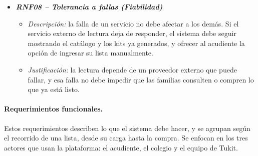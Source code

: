 \begin{itemize}
\item \textbf{\textit{RNF08 -- Tolerancia a fallas (Fiabilidad)}}
  \begin{itemize}
    \item \textit{Descripción:} la falla de un servicio no debe afectar a los demás. Si el
          servicio externo de lectura deja de responder, el sistema debe seguir mostrando
          el catálogo y los kits ya generados, y ofrecer al acudiente la opción de ingresar
          su lista manualmente.
    \item \textit{Justificación:} la lectura depende de un proveedor externo que puede
          fallar, y esa falla no debe impedir que las familias consulten o compren lo que
          ya está listo.
  \end{itemize}
\end{itemize}

\paragraph{Requerimientos funcionales.} Estos requerimientos describen lo que el sistema
debe hacer, y se agrupan según el recorrido de una lista, desde su carga hasta la compra.
Se enfocan en los tres actores que usan la plataforma: el acudiente, el colegio y el equipo
de Tukit.\par


